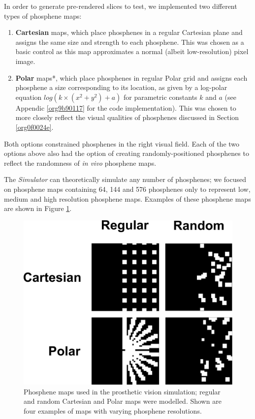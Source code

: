 \documentclass[a4paper,11pt,openany]{book}
\begin{document}
In order to generate pre-rendered slices to test, we implemented two different types of phosphene maps:
\begin{enumerate}
\item \textbf{Cartesian} maps, which place phosphenes in a regular Cartesian plane and assigns the same size and strength to each phosphene.
This was chosen as a basic control as this map approximates a normal (albeit low-resolution) pixel image.
\item \textbf{Polar} maps*, which place phosphenes in regular Polar grid and assigns each phosphene a size corresponding to its location, as given by a log-polar equation \(log(k \times (x^2 + y^2) + a)\) for parametric constants \(k\) and \(a\) (see Appendic \ref{org9b90117} for the code implementation).
This was chosen to more closely reflect the visual qualities of phosphenes discussed in Section \ref{org0f0024e}.
\end{enumerate}

Both options constrained phosphenes in the right visual field.
Each of the two options above also had the option of creating randomly-positioned phosphenes to reflect the randomness of \emph{in vivo} phosphene maps.

The \emph{Simulator} can theoretically simulate any number of phosphenes; we focused on phosphene maps containing 64, 144 and 576 phosphenes only to represent low, medium and high resolution phosphene maps.
Examples of these phosphene maps are shown in Figure \ref{fig:orgfb16671}.

\begin{figure}[htbp]
\centering
\includegraphics[height=0.4\textheight]{./images/methods_maps.png}
\caption[Phosphene maps used in the prosthetic vision simulation]{\label{fig:orgfb16671}
Phosphene maps used in the prosthetic vision simulation; regular and random Cartesian and Polar maps were modelled. Shown are four examples of maps with varying phosphene resolutions.}
\end{figure}
\end{document}
